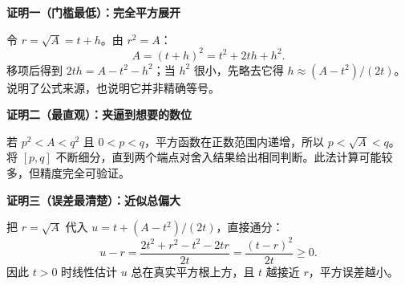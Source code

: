 \clearpage
\begin{proofbox}
\textbf{\textcolor{CProof}{证明一（门槛最低）：完全平方展开}}
\par\medskip
\begin{center}

\end{center}
\medskip
令 $r=\sqrt A=t+h$。由 $r^2=A$：\[A=(t+h)^2=t^2+2th+h^2.\]移项后得到 $2th=A-t^2-h^2$；当 $h^2$ 很小，先略去它得 $h\approx(A-t^2)/(2t)$。说明了公式来源，也说明它并非精确等号。
\end{proofbox}
\clearpage
\begin{proofbox}
\textbf{\textcolor{CProof}{证明二（最直观）：夹逼到想要的数位}}
\par\medskip
\begin{center}

\end{center}
\medskip
若 $p^2<A<q^2$ 且 $0<p<q$，平方函数在正数范围内递增，所以 $p<\sqrt A<q$。将 $[p,q]$ 不断细分，直到两个端点对舍入结果给出相同判断。此法计算可能较多，但精度完全可验证。
\end{proofbox}
\clearpage
\begin{proofbox}
\textbf{\textcolor{CProof}{证明三（误差最清楚）：近似总偏大}}
\par\medskip
\begin{center}

\end{center}
\medskip
把 $r=\sqrt A$ 代入 $u=t+(A-t^2)/(2t)$，直接通分：\[u-r=\frac{2t^2+r^2-t^2-2tr}{2t}=\frac{(t-r)^2}{2t}\ge0.\]因此 $t>0$ 时线性估计 $u$ 总在真实平方根上方，且 $t$ 越接近 $r$，平方误差越小。
\end{proofbox}
